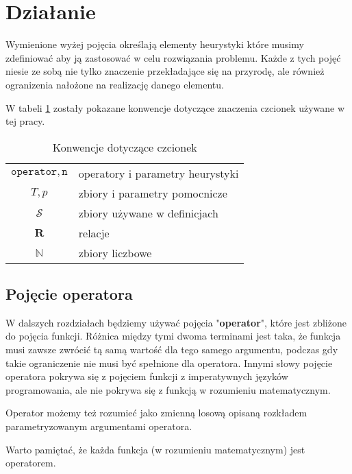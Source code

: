 \documentclass[twoside]{iisthesis}
\newcommand{\numberSet}{\mathbb}
\newcommand{\important}{\mathcal}
\newcommand{\R}{\mathbf{R}}
\newcommand{\param}{\mathtt}
\begin{document}
\section{Działanie}

Wymienione wyżej pojęcia określają elementy heurystyki które musimy zdefiniować aby ją zastosować w celu rozwiązania problemu. Każde z tych pojęć niesie ze sobą nie tylko znaczenie przekładające się na przyrodę, ale również ogranizenia nałożone na realizację danego elementu.

W tabeli \ref{table_signature_conventions} zostały pokazane konwencje dotyczące znaczenia czcionek używane w tej pracy.


\begin{table}
	\caption{Konwencje dotyczące czcionek \label{table_signature_conventions}}
	\centering
	\begin{tabular}{cl}
		$\param{operator}, \param{n}$ & operatory i parametry heurystyki \\
		$T, p$ & zbiory i parametry pomocnicze \\
		$\important{S}$ & zbiory używane w definicjach \\
		$\R$ & relacje \\
		$\numberSet{N}$ & zbiory liczbowe
	\end{tabular}
\end{table}

\subsection{Pojęcie operatora} \label{subsection_operator}

W dalszych rozdziałach będziemy używać pojęcia "\textbf{operator}", które jest zbliżone do pojęcia funkcji. Różnica między tymi dwoma terminami jest taka, że funkcja musi zawsze zwrócić tą samą wartość dla tego samego argumentu, podczas gdy takie ograniczenie nie musi być spełnione dla operatora. Innymi słowy pojęcie operatora pokrywa się z pojęciem funkcji z imperatywnych języków programowania, ale nie pokrywa się z funkcją w rozumieniu matematycznym.

Operator możemy też rozumieć jako zmienną losową opisaną rozkładem parametryzowanym argumentami operatora.

Warto pamiętać, że każda funkcja (w rozumieniu matematycznym) jest operatorem.
\end{document}
